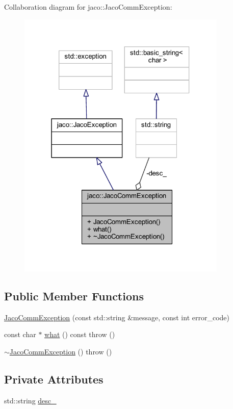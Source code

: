Collaboration diagram for jaco\+:\+:Jaco\+Comm\+Exception\+:
\nopagebreak
\begin{figure}[H]
\begin{center}
\leavevmode
\includegraphics[width=283pt]{d5/dd0/classjaco_1_1JacoCommException__coll__graph}
\end{center}
\end{figure}
\subsection*{Public Member Functions}
\begin{DoxyCompactItemize}
\item 
\hyperlink{classjaco_1_1JacoCommException_af6c28818c201bacdc8a08a346325822c}{Jaco\+Comm\+Exception} (const std\+::string \&message, const int error\+\_\+code)
\item 
const char $\ast$ \hyperlink{classjaco_1_1JacoCommException_a7689658c873a6b22857db7c2bb630d43}{what} () const   throw ()
\item 
\hyperlink{classjaco_1_1JacoCommException_a8ef866b21c40fcc539984e0d90f355e3}{$\sim$\+Jaco\+Comm\+Exception} ()  throw ()
\end{DoxyCompactItemize}
\subsection*{Private Attributes}
\begin{DoxyCompactItemize}
\item 
std\+::string \hyperlink{classjaco_1_1JacoCommException_ab8c43df074f755cbfc7a6d6bf1b7a950}{desc\+\_\+}
\end{DoxyCompactItemize}


